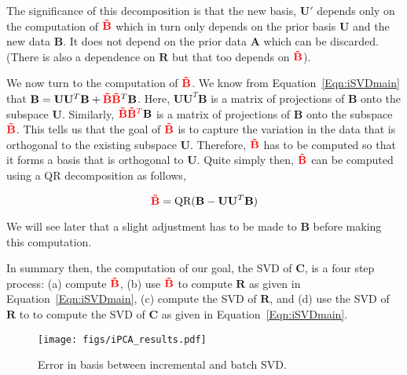 The significance of this decomposition is that the new basis, $\mathbf{U'}$ depends only on the computation of ${\color{red}\mathbf{\tilde{B}}}$ which in turn only depends on the prior basis $\mathbf{U}$ and the new data  $\mathbf{B}$.  It does not depend on the prior data $\mathbf{A}$ which can be discarded.  (There is also a dependence on $\mathbf{R}$ but that too depends on ${\color{red}\mathbf{\tilde{B}}}$).

We now turn to the computation of $ {\color{red}\mathbf{\tilde{B}}}$.  We know from Equation~\ref{Eqn:iSVDmain} that $\mathbf{B}=\mathbf{U}\mathbf{U}^T\mathbf{B} + {\color{red}\mathbf{\tilde{B}}} {{\color{red}\mathbf{\tilde{B}}}^T}\mathbf{B}$.  Here, $\mathbf{U}\mathbf{U}^T\mathbf{B}$ is a matrix of projections of $\mathbf{B}$ onto the subspace $\mathbf{U}$.  Similarly, ${\color{red}\mathbf{\tilde{B}}} {\color{red}\mathbf{\tilde{B}}^T}\mathbf{B}$ is a matrix of projections of $\mathbf{B}$ onto the subspace ${\color{red}\mathbf{\tilde{B}}}$.  This tells us that the goal of ${\color{red}\mathbf{\tilde{B}}}$ is to capture the variation in the data that is orthogonal to the existing subspace $\mathbf{U}$.  Therefore, ${\color{red}\mathbf{\tilde{B}}}$ has to be computed so that it forms a basis that is orthogonal to $\mathbf{U}$.  Quite simply then, ${\color{red}\mathbf{\tilde{B}}}$ can be computed using a QR decomposition as follows,


\begin{equation}
{\color{red}\mathbf{\tilde{B}}}=\textrm{QR}(\mathbf{B} - \mathbf{U}\mathbf{U}^T\mathbf{B})
\end{equation}

We will see later that a slight adjustment has to be made to $\mathbf{B}$ before making this computation.

In summary then, the computation of our goal, the SVD of $\mathbf{C}$, is a four step process: (a) compute ${\color{red}\mathbf{\tilde{B}}}$, (b) use ${\color{red}\mathbf{\tilde{B}}}$ to compute $\mathbf{R}$ as given in Equation~\ref{Eqn:iSVDmain}, (c) compute the SVD of $\mathbf{R}$, and (d) use the SVD of $\mathbf{R}$ to to compute the SVD of $\mathbf{C}$ as given in Equation~\ref{Eqn:iSVDmain}.  

								\begin{figure}[t]
								\centering
								\texttt{[image: figs/iPCA\_results.pdf]}
								\caption{Error in basis between incremental and batch SVD.}
								\label{iPCA_results}
								\end{figure}

